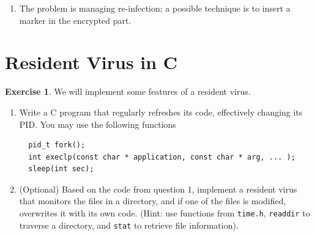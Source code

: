 \documentclass[a4paper,11pt]{article}
\theoremstyle{plain}
\theoremstyle{definition}
\newtheorem{exercice}{Exercise}
\begin{document}
\begin{correction}
\begin{enumerate}
\item The problem is managing re-infection; a possible technique is to insert a marker in the encrypted part.
\end{enumerate}
\end{correction}

\section{Resident Virus in C}

\begin{exercice} We will implement some features of a resident virus.
\begin{enumerate}
\item Write a C program that regularly refreshes its code, effectively changing its PID. You may use the following functions
\begin{verbatim}
  pid_t fork();
  int execlp(const char * application, const char * arg, ... );
  sleep(int sec);
\end{verbatim}
\item (Optional) Based on the code from question 1, implement a resident virus that monitors the files in a directory, and if one of the files is modified, overwrites it with its own code. (Hint: use functions from \texttt{time.h}, \texttt{readdir} to traverse a directory, and \texttt{stat} to retrieve file information).
\end{enumerate}
\end{exercice}
\end{document}
